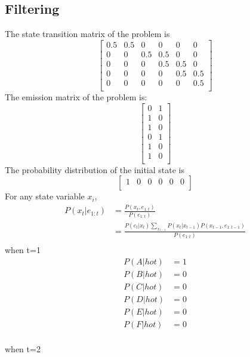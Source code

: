 \documentclass[12pt]{amsart}
\begin{document}
\subsection*{Filtering}
The state transition matrix of the problem is
\[
\begin{bmatrix}
    0.5       & 0.5 & 0 &0 & 0 & 0 \\
    0       & 0 & 0.5 &0.5& 0 & 0 \\
    0       & 0 & 0 &0.5 & 0.5 & 0 \\
    0       & 0 & 0 &0 & 0.5 & 0.5 \\
    0       & 0 & 0 &0 & 0 & 0.5 \\
\end{bmatrix}
\]
The emission matrix of the problem is:
\[
\begin{bmatrix}
    0   & 1  \\
    1   & 0  \\
    1   & 0  \\
    0   & 1  \\
    1   & 0  \\
    1   & 0  \\
\end{bmatrix}
\]
The probability distribution of the initial state is 
\[
\begin{bmatrix}
    1       & 0 & 0 &0 & 0 & 0 \\
\end{bmatrix}
\]
For any state variable $x_i$, 
\begin{equation} \label{eq1}
\begin{split}
P(x_t | e_{1:t})    & = \frac{P(x_t , e_{1:t})}{P(e_{1:t})} \\
 			  & = \frac{P(e_t | x_t) \sum_{x_{t-1}}{P(x_t|x_{t-1}) P(x_{t-1} , e_{1:t-1})}}{P(e_{1:t})} \\
\end{split}
\end{equation}
when t=1
\begin{align*}
P(A|hot)  &= 1 \\
P(B|hot) &= 0 \\
P(C|hot) &= 0 \\
P(D|hot) &= 0 \\
P(E|hot) &= 0 \\
P(F|hot) &= 0 \\
\end{align*}

when t=2
\end{document}
